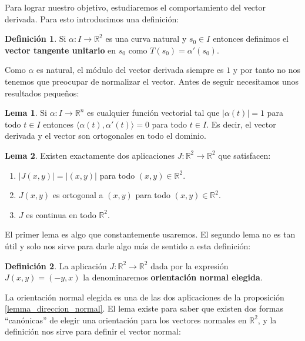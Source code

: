 \documentclass{article}
\theoremstyle{definition}
\newtheorem{lemma}{Lema}
\newtheorem{define}{Definición}
\newcommand{\reales}{\mathbb{R}}
\begin{document}
Para lograr nuestro objetivo, estudiaremos el comportamiento del vector derivada. Para esto introducimos una definición:

\begin{define}\label{def_curva_vector_tangente1}
	Si $\alpha: I \rightarrow \reales^2$ es una curva natural y $s_0 \in I$ entonces definimos el \textbf{vector tangente unitario} en $s_0$ como $T(s_0) = \alpha'(s_0)$.
\end{define}

Como $\alpha$ es natural, el módulo del vector derivada siempre es $1$ y por tanto no nos tenemos que preocupar de normalizar el vector. Antes de seguir necesitamos unos resultados pequeños:

\begin{lemma}\label{lemma_vectores_unitarios}
	Si $\alpha: I \rightarrow \reales^{n}$ es cualquier función vectorial tal que $|\alpha(t)| = 1$ para todo $t \in I$ entonces $\langle \alpha(t),\alpha'(t) \rangle = 0$ para todo $t \in I$. Es decir, el vector derivada y el vector son ortogonales en todo el dominio.
\end{lemma}

\begin{lemma}\label{lemma_direccion_normal}
	Existen exactamente dos aplicaciones $J:\reales^{2} \rightarrow \reales^{2}$ que satisfacen:
	\begin{enumerate}
		\item
		$|J(x, y)| = |(x, y)|$ para todo $(x, y) \in \reales^{2}$.
		\item
		$J(x, y)$ es ortogonal a $(x, y)$ para todo $(x, y) \in \reales^{2}$.
		\item
		$J$ es continua en todo $\reales^{2}$.
	\end{enumerate}
\end{lemma}

El primer lema es algo que constantemente usaremos. El segundo lema no es tan útil y solo nos sirve para darle algo más de sentido a esta definición:

\begin{define}
	La aplicación $J:\reales^{2} \rightarrow \reales^{2}$ dada por la expresión $J(x, y) = (-y, x)$ la denominaremos \textbf{orientación normal elegida}.
\end{define}

La orientación normal elegida es una de las dos aplicaciones de la proposición \eqref{lemma_direccion_normal}. El lema existe para saber que existen dos formas ``canónicas'' de elegir una orientación para los vectores normales en $\reales^2$, y la definición nos sirve para definir el vector normal:
\end{document}

